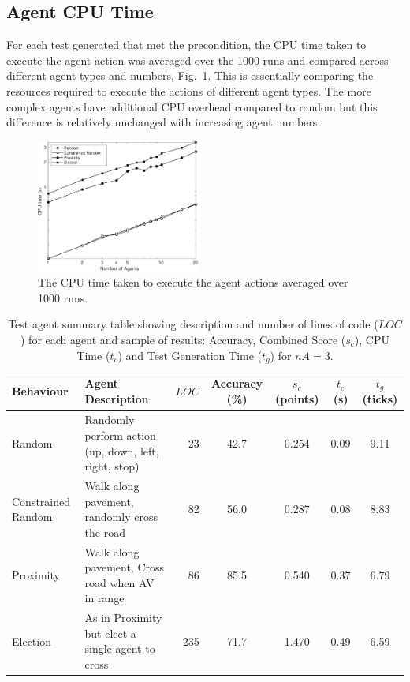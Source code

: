 \documentclass[letterpaper, 10 pt, journal, twoside]{IEEEtran}
\begin{document}
\subsection{Agent CPU Time}
For each test generated that met the precondition, the CPU time taken to execute the agent action was averaged over the 1000 runs and compared across different agent types and numbers, Fig.~\ref{CPUTime}. This is essentially comparing the resources required to execute the actions of different agent types. The more complex agents have additional CPU overhead compared to random but this difference is relatively unchanged with increasing agent numbers. 

\begin{figure}[!t]
	\centering
\includegraphics[width=0.48\textwidth]{TimeCPU.pdf}
	\caption{The CPU time taken to execute the agent actions averaged over 1000 runs.}
	\label{CPUTime}
\end{figure}


\begin{table}
\centering
\caption{Test agent summary table showing description and number of lines of code ($LOC$) for each agent and sample of results: Accuracy, Combined Score ($s_c$), CPU Time ($t_{c}$) and Test Generation Time ($t_{g}$) for $nA=3$.}
\label{ResultsTable}
\begin{tabular}{|l|p{6.2cm}|r||c|c|c|c|}
\hline
\textbf{Behaviour} & \textbf{Agent Description} & $LOC$ & Accuracy (\%) & $s_c$ (points)&  $t_{c}$ (s) & $t_{g}$ (ticks) \\
\hline
Random & Randomly perform action (up, down, left, right, stop)  		&  23& 42.7 & 0.254 & 0.09 & 9.11 \\
Constrained Random & Walk along pavement, randomly cross the road 		&  82& 56.0 & 0.287 & 0.08 & 8.83 \\
Proximity & Walk along pavement, Cross road when AV in range 			&  86& 85.5 & 0.540 & 0.37 & 6.79 \\
Election & As in Proximity but elect a single agent to cross 			& 235& 71.7 & 1.470 & 0.49 & 6.59 \\
\hline 
\end{tabular}
\end{table}
\end{document}

